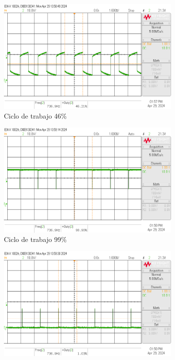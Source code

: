 \documentclass{article}
\begin{document}
\begin{figure}[H]
    \centering
    \begin{subfigure}{.3\textwidth}
        \centering
        \includegraphics[width=\linewidth]{images/scope_1.png}
        \caption{Ciclo de trabajo 46\%}
        \label{fig:senoidal_1}
    \end{subfigure}%
    \hfill
    \begin{subfigure}{.3\textwidth}
        \centering
        \includegraphics[width=\linewidth]{images/scope_2.png}
        \caption{Ciclo de trabajo 99\%}
        \label{fig:senoidal_2}
    \end{subfigure}
    \hfill
    \begin{subfigure}{.3\textwidth}
        \centering
        \includegraphics[width=\linewidth]{images/scope_3.png}

\end{subfigure}
\end{figure}
\end{document}
